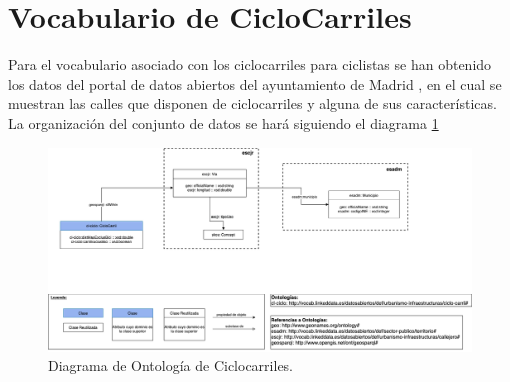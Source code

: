 \section{Vocabulario de CicloCarriles}

Para el vocabulario asociado con los ciclocarriles para ciclistas se han obtenido los datos del portal de datos abiertos del ayuntamiento de Madrid \cite{datosMadrid_ciclocarriles}, en el cual se muestran las calles que disponen de ciclocarriles y alguna de sus características.
\newline
\newline
La organización del conjunto de datos se hará siguiendo el diagrama \ref{fig:diagramaOntologCicloCarr}

\begin{figure}[h]
    \centering
        \includegraphics[angle=0, width=1\textwidth]{images/diagramaCicloCarril.png}
    \caption{Diagrama de Ontología de Ciclocarriles.}
    \label{fig:diagramaOntologCicloCarr}
\end{figure}





